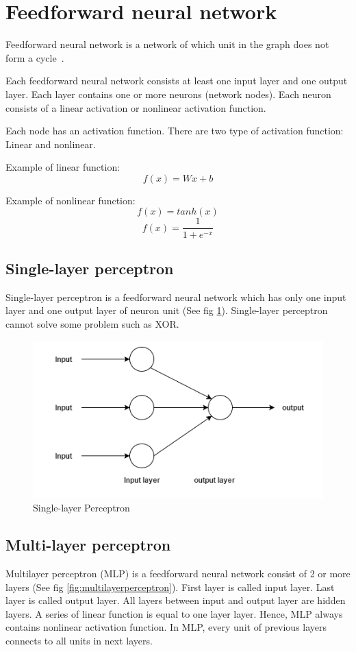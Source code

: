 \section{Feedforward neural network}
Feedforward neural network is a network of which unit in the graph does not form a cycle~\cite{deeplearning-book}.

Each feedforward neural network consists at least one input layer and one output layer.
Each layer contains one or more neurons (network nodes).
Each neuron consists of a linear activation or nonlinear activation function.

Each node has an activation function. There are two type of activation function: Linear and nonlinear.

Example of linear function: \\

\begin{equation} \label{eq:linearmlp}
{f(x) = Wx + b }
\end{equation}

Example of nonlinear function: \\
\[f(x) = tanh(x) \]
\[f(x) =\frac{1}{1+e^{-x}} \]

\subsection{Single-layer perceptron}
Single-layer perceptron is a feedforward neural network which has only one input layer and one output layer of neuron unit (See fig \ref{fig:singleperceptron}). Single-layer perceptron cannot solve some problem such as XOR.
\begin{figure}[H]
	\centering
	\includegraphics[width=0.7\linewidth]{figure/singleperceptron}
	\caption[Single-layer Perceptron]{Single-layer Perceptron}
	\label{fig:singleperceptron}
\end{figure}



\subsection{Multi-layer perceptron}
Multilayer perceptron (MLP) is a feedforward neural network consist of 2 or more layers (See fig \ref{fig:multilayerperceptron}).
First layer is called input layer.
Last layer is called output layer.
All layers between input and output layer are hidden layers.
A series of linear function is equal to one layer layer.
Hence, MLP always contains nonlinear activation function.
In MLP, every unit of previous layers connects to all units in next layers.

